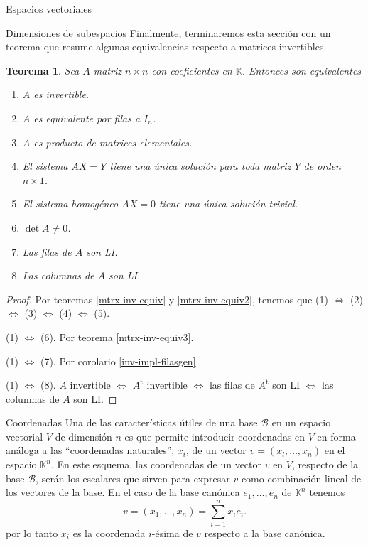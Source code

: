 \documentclass[a4paper,12pt,twoside,spanish]{amsbook}
\newtheorem{teorema}{Teorema}[section]
\theoremstyle{definition}
\theoremstyle{remark}
\renewcommand{\t}{{\operatorname{t}}}
\newcommand{\K}{\mathbb K}
\begin{document}
\begin{chapter}{Espacios vectoriales}
\begin{section}{Dimensiones de subespacios}
Finalmente, terminaremos esta sección con un teorema que resume algunas equivalencias respecto a matrices invertibles.

\begin{teorema}
	Sea $A$ matriz $n \times n$ con coeficientes en $\K$. Entonces son equivalentes
	\begin{enumerate} 
		\item $A$ es invertible.
		\item $A$  es equivalente por filas a $I_n$.
		\item $A$ es producto de matrices elementales.
		\item El sistema $AX=Y$ tiene una única solución para toda matriz $Y$ de orden $n \times 1$. 
		\item El sistema homogéneo $AX=0$ tiene una única solución trivial.
		\item $\det A \ne 0$.
		\item Las filas de $A$ son LI.
		\item Las columnas de $A$ son LI.
	\end{enumerate}
\end{teorema}
\begin{proof} Por teoremas \ref{mtrx-inv-equiv} y  \ref{mtrx-inv-equiv2}, tenemos que 	(1) $\Leftrightarrow$ 	(2) $\Leftrightarrow$ 	(3) $\Leftrightarrow$ 	(4) $\Leftrightarrow$ 	(5).
	
	(1) $\Leftrightarrow$ (6). Por teorema \ref{mtrx-inv-equiv3}.
	
	(1) $\Leftrightarrow$ (7). Por corolario \ref{inv-impl-filasgen}.
	
	(1) $\Leftrightarrow$ (8). $A$ invertible $\Leftrightarrow$ $A^\t$ invertible $\Leftrightarrow$  las filas de $A^\t$ son LI $\Leftrightarrow$  las columnas de $A$ son LI. 
\end{proof}
	
	\end{section}




	\begin{section}{Coordenadas}
		Una de las características útiles de una base $\mathcal B$ en un espacio vectorial  $V$ de dimensión $n$ es que permite introducir coordenadas en $V$ en forma análoga a las ``coordenadas naturales'', $x_i$, de un vector $v = (x_l,\ldots, x_n)$ en el espacio $\K^n$. En este esquema, las coordenadas de un vector $v$ en $V$, respecto de la base $\mathcal B$, serán los escalares que sirven para expresar $v$ como combinación lineal de los vectores de la base. En  el caso  de la base canónica $e_1,\ldots,e_n$ de $\K^n$ tenemos
		$$
		v = (x_1,\ldots,x_n) = \sum_{i=1}^{n} x_ie_i.
		$$
		por lo tanto $x_i$  es la coordenada $i$-ésima de $v$ respecto a la base canónica. 
		

\end{section}
\end{chapter}
\end{document}
